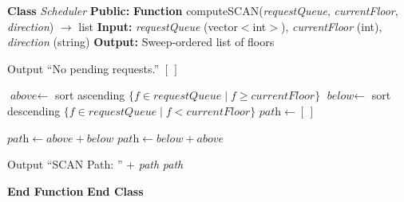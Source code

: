 \documentclass[a4paper,11pt]{article}
\begin{document}
\begin{algorithm}
\caption{Calculate Path -- SCAN}
\begin{algorithmic}[1]

\State \textbf{Class} \textit{Scheduler}
\State \hspace{0.5cm} \textbf{Public:}
\State \hspace{1cm} \textbf{Function} computeSCAN(\textit{requestQueue}, \textit{currentFloor}, \textit{direction}) $\rightarrow$ list
\State \hspace{1.5cm} \textbf{Input:} \textit{requestQueue} (vector$<$int$>$), \textit{currentFloor} (int), \textit{direction} (string)
\State \hspace{1.5cm} \textbf{Output:} Sweep-ordered list of floors

    \State Output ``No pending requests.''
    \State \Return $[\,]$
\EndIf

\State $\textit{above} \leftarrow$ sort ascending $\{f \in \textit{requestQueue} \mid f \geq \textit{currentFloor}\}$
\State $\textit{below} \leftarrow$ sort descending $\{f \in \textit{requestQueue} \mid f < \textit{currentFloor}\}$
\State $\textit{path} \leftarrow [\,]$

    \State $\textit{path} \leftarrow \textit{above} + \textit{below}$
\Else
    \State $\textit{path} \leftarrow \textit{below} + \textit{above}$
\EndIf

\State Output ``SCAN Path: '' + \textit{path}
\State \Return \textit{path}

\State \hspace{1cm} \textbf{End Function}
\State \textbf{End Class}

\end{algorithmic}
\end{algorithm}
\end{document}
